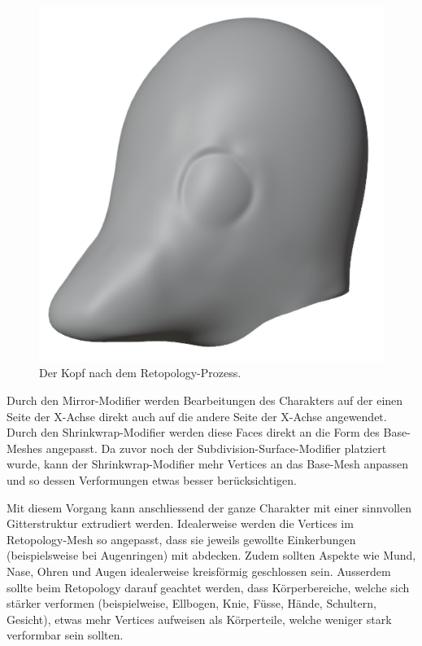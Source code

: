 \documentclass[
]{book}
\let\oldmarginnote\marginnote
\renewcommand{\marginnote}[1]{%
  \oldmarginnote{{\footnotesize\selectfont #1}}%
}
\begin{document}
\begin{figure}

\includegraphics{Chapters/Images/Chapter_41/41_5_Object_Head.png}

\caption{\label{fig-1_5}Der Kopf nach dem Retopology-Prozess.}

\end{figure}%

\marginnote{Was bewirken die Modifier?}

Durch den Mirror-Modifier werden Bearbeitungen des Charakters auf der
einen Seite der X-Achse direkt auch auf die andere Seite der X-Achse
angewendet. Durch den Shrinkwrap-Modifier werden diese Faces direkt an
die Form des Base-Meshes angepasst. Da zuvor noch der
Subdivision-Surface-Modifier platziert wurde, kann der
Shrinkwrap-Modifier mehr Vertices an das Base-Mesh anpassen und so
dessen Verformungen etwas besser berücksichtigen.

Mit diesem Vorgang kann anschliessend der ganze Charakter mit einer
sinnvollen Gitterstruktur extrudiert werden. Idealerweise werden die
Vertices im Retopology-Mesh so angepasst, dass sie jeweils gewollte
Einkerbungen (beispielsweise bei Augenringen) mit abdecken. Zudem
sollten Aspekte wie Mund, Nase, Ohren und Augen idealerweise kreisförmig
geschlossen sein. Ausserdem sollte beim Retopology darauf geachtet
werden, dass Körperbereiche, welche sich stärker verformen
(beispielweise, Ellbogen, Knie, Füsse, Hände, Schultern, Gesicht), etwas
mehr Vertices aufweisen als Körperteile, welche weniger stark verformbar
sein sollten.
\end{document}
